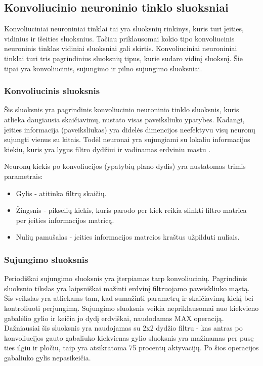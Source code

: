 \documentclass{VUMIFPSkursinis}
\begin{document}
\subsection{Konvoliucinio neuroninio tinklo sluoksniai}
Konvoliuciniai neuroniniai tinklai tai yra sluoksnių rinkinys, kuris turi įeities, vidinius ir išeities sluoksnius. Tačiau priklausomai 
kokio tipo konvoliucinis neuroninis tinklas vidiniai sluoksniai gali skirtis. Konvoliuciniai neuroniniai tinklai turi tris pagrindinius 
sluoksnių tipus, kurie sudaro vidinį sluoksnį. Šie tipai yra konvoliucinis, sujungimo ir pilno sujungimo sluoksniai.

\subsubsection{Konvoliucinis sluoksnis}
Šis sluoksnis yra pagrindinis konvoliucinio neuroninio tinklo sluoksnis, kuris atlieka daugiausia skaičiavimų, nustato visas paveiksliuko ypatybes.
Kadangi, įeities informacija (paveiksliukas) yra didelės dimencijos neefektyvu visų neuronų sujungti vienus su kitais. Todėl neuronai yra sujungiami
su lokaliu informacijos kiekiu, kuris yra lygus filtro dydžiui ir vadinamas erdviniu mastu \cite{layers-CS231n}.

Neuronų kiekis po konvoliucijos (ypatybių plano dydis) yra nustatomas trimis parametrais:
\begin{itemize}
\item Gylis - atitinka filtrų skaičių.
\item Žingsnis - pikselių kiekis, kuris parodo per kiek reikia slinkti filtro matrica per įeities informacijos matricą.
\item Nulių pamušalas - įeities informacijos matrcios kraštus užpilduti nuliais.
\end{itemize}

\subsubsection{Sujungimo sluoksnis}
Periodiškai sujungimo sluoksnis yra įterpiamas tarp konvoliucinių. Pagrindinis sluoksnio tikslas yra laipsniškai mažinti erdvinį filtruojamo paveiskliuko mąstą.
Šis veikslas yra atliekams tam, kad sumažinti parametrų ir skaičiavimų kiekį bei kontroliuoti perjungimą. Sujungimo sluoksnis veikia nepriklausomai nuo kiekvieno
gabalėlio gylio ir keičia jo dydį erdviškai, naudodamas MAX operaciją. Dažniausiai šis sluoksnis yra naudojamas su 2x2 dydžio filtru - kas antras po konvoliucijos 
gauto gabaliuko kiekvienas gylio sluoksnis yra mažinamas per pusę ties ilgiu ir pločiu, taip yra atsikratoma 75 procentų aktyvacijų. Po šios operacijos gabaliuko 
gylis nepasikeičia.
\end{document}
